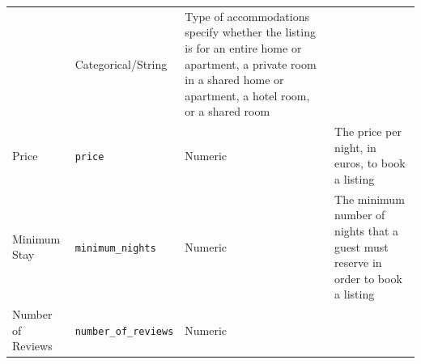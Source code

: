 \documentclass[]{article}
\begin{document}
\begin{longtable}[]{@{}llll@{}}
\begin{minipage}[t]{0.22\columnwidth}
\end{minipage} & \begin{minipage}[t]{0.22\columnwidth}\raggedright
Categorical/String\strut
\end{minipage} & \begin{minipage}[t]{0.22\columnwidth}\raggedright
Type of accommodations specify whether the listing is for an entire home
or apartment, a private room in a shared home or apartment, a hotel
room, or a shared room\strut
\end{minipage}\tabularnewline
\begin{minipage}[t]{0.22\columnwidth}\raggedright
Price\strut
\end{minipage} & \begin{minipage}[t]{0.22\columnwidth}\raggedright
\texttt{price}\strut
\end{minipage} & \begin{minipage}[t]{0.22\columnwidth}\raggedright
Numeric\strut
\end{minipage} & \begin{minipage}[t]{0.22\columnwidth}\raggedright
The price per night, in euros, to book a listing\strut
\end{minipage}\tabularnewline
\begin{minipage}[t]{0.22\columnwidth}\raggedright
Minimum Stay\strut
\end{minipage} & \begin{minipage}[t]{0.22\columnwidth}\raggedright
\texttt{minimum\_nights}\strut
\end{minipage} & \begin{minipage}[t]{0.22\columnwidth}\raggedright
Numeric\strut
\end{minipage} & \begin{minipage}[t]{0.22\columnwidth}\raggedright
The minimum number of nights that a guest must reserve in order to book
a listing\strut
\end{minipage}\tabularnewline
\begin{minipage}[t]{0.22\columnwidth}\raggedright
Number of Reviews\strut
\end{minipage} & \begin{minipage}[t]{0.22\columnwidth}\raggedright
\texttt{number\_of\_reviews}\strut
\end{minipage} & \begin{minipage}[t]{0.22\columnwidth}\raggedright
Numeric\strut
\end{minipage} & \begin{minipage}[t]{0.22\columnwidth}\raggedright

\end{minipage}
\end{longtable}
\end{document}

